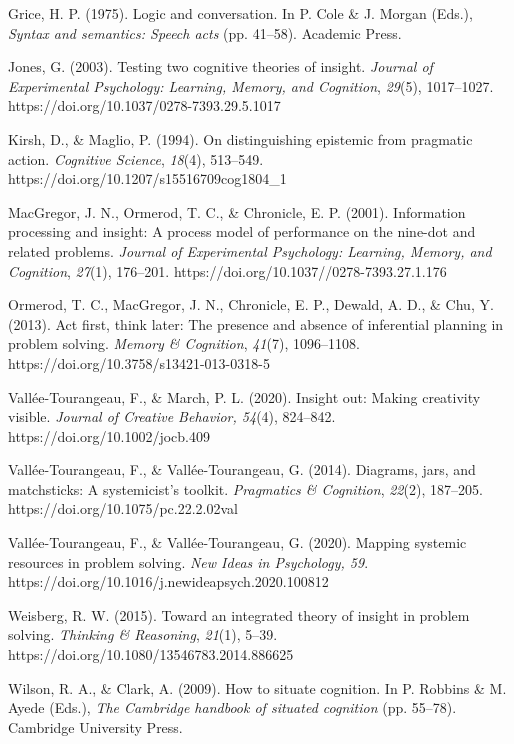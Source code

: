 \documentclass{article}
\begin{document}
Grice, H. P. (1975). Logic and conversation. In P. Cole \& J. Morgan (Eds.), \emph{Syntax and semantics: Speech acts} (pp. 41--58). Academic Press.

Jones, G. (2003). Testing two cognitive theories of insight. \emph{Journal of Experimental Psychology: Learning, Memory, and Cognition}, \emph{29}(5), 1017--1027. https://doi.org/10.1037/0278-7393.29.5.1017

Kirsh, D., \& Maglio, P. (1994). On distinguishing epistemic from pragmatic action. \emph{Cognitive Science}, \emph{18}(4), 513--549. https://doi.org/10.1207/s15516709cog1804\_1

MacGregor, J. N., Ormerod, T. C., \& Chronicle, E. P. (2001). Information processing and insight: A process model of performance on the nine-dot and related problems. \emph{Journal of Experimental Psychology: Learning, Memory, and Cognition}, \emph{27}(1), 176--201. https://doi.org/10.1037//0278-7393.27.1.176

Ormerod, T. C., MacGregor, J. N., Chronicle, E. P., Dewald, A. D., \& Chu, Y. (2013). Act first, think later: The presence and absence of inferential planning in problem solving. \emph{Memory \& Cognition}, \emph{41}(7), 1096--1108. https://doi.org/10.3758/s13421-013-0318-5

Vallée-Tourangeau, F., \& March, P. L. (2020). Insight out: Making creativity visible. \emph{Journal of Creative Behavior, 54}(4), 824--842. https://doi.org/10.1002/jocb.409

Vallée-Tourangeau, F., \& Vallée-Tourangeau, G. (2014). Diagrams, jars, and matchsticks: A systemicist's toolkit. \emph{Pragmatics \& Cognition}, \emph{22}(2), 187--205. https://doi.org/10.1075/pc.22.2.02val

Vallée-Tourangeau, F., \& Vallée-Tourangeau, G. (2020). Mapping systemic resources in problem solving. \emph{New Ideas in Psychology, 59}. https://doi.org/10.1016/j.newideapsych.2020.100812

Weisberg, R. W. (2015). Toward an integrated theory of insight in problem solving. \emph{Thinking \& Reasoning}, \emph{21}(1), 5--39. https://doi.org/10.1080/13546783.2014.886625

Wilson, R. A., \& Clark, A. (2009). How to situate cognition. In P. Robbins \& M. Ayede (Eds.), \emph{The Cambridge handbook of situated cognition} (pp. 55--78). Cambridge University Press.
\end{document}
